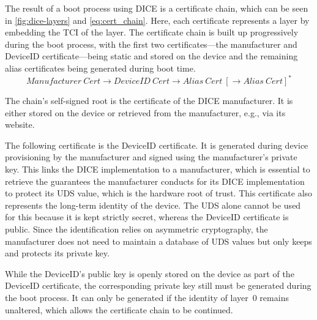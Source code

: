 
The result of a boot process using \ac{DICE} is a certificate chain, which can be seen in \autoref{fig:dice-layers} and \autoref{eq:cert_chain}.
Here, each certificate represents a layer by embedding the \ac{TCI} of the layer.
The certificate chain is built up progressively during the boot process, with the first two certificates---the manufacturer and DeviceID certificate---being static and stored on the device and the remaining alias certificates being generated during boot time.
\begin{equation}
  \label{eq:cert_chain}
  Manufacturer\ Cert \rightarrow DeviceID\ Cert \rightarrow Alias\ Cert\ [\rightarrow Alias\ Cert]^*
\end{equation}

The chain's self-signed root is the certificate of the DICE manufacturer.
It is either stored on the device or retrieved from the manufacturer, e.g., via its website.




The following certificate is the DeviceID certificate.
It is generated during device provisioning by the manufacturer and signed using the manufacturer's private key.
This links the \ac{DICE} implementation to a manufacturer, which is essential to retrieve the guarantees the manufacturer conducts for its \ac{DICE} implementation to protect its \ac{UDS} value, which is the hardware root of trust.
This certificate also represents the long-term identity of the device.
The \ac{UDS} alone cannot be used for this because it is kept strictly secret, whereas the DeviceID certificate is public.
Since the identification relies on asymmetric cryptography, the manufacturer does not need to maintain a database of \ac{UDS} values but only keeps and protects its private key.


While the DeviceID's public key is openly stored on the device as part of the DeviceID certificate, the corresponding private key still must be generated during the boot process.
It can only be generated if the identity of layer~0 remains unaltered, which allows the certificate chain to be continued.

